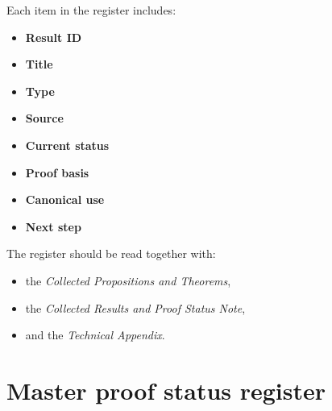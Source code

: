 \documentclass[12pt]{article}
\begin{document}
	Each item in the register includes:
	\begin{itemize}[leftmargin=2em]
		\item \textbf{Result ID}
		\item \textbf{Title}
		\item \textbf{Type}
		\item \textbf{Source}
		\item \textbf{Current status}
		\item \textbf{Proof basis}
		\item \textbf{Canonical use}
		\item \textbf{Next step}
	\end{itemize}
	
	The register should be read together with:
	\begin{itemize}[leftmargin=2em]
		\item the \emph{Collected Propositions and Theorems},
		\item the \emph{Collected Results and Proof Status Note},
		\item and the \emph{Technical Appendix}.
	\end{itemize}
	
	\section{Master proof status register}
	
\end{document}
